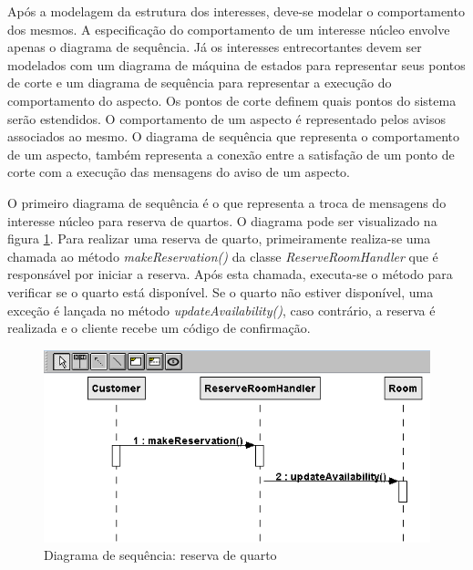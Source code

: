 Após a modelagem da estrutura dos interesses, deve-se modelar o comportamento dos mesmos. A especificação do comportamento de um interesse núcleo
envolve apenas o diagrama de sequência. Já os interesses entrecortantes devem ser modelados com um diagrama de máquina de estados para representar
seus pontos de corte e um diagrama de sequência para representar a execução do comportamento do aspecto. Os pontos de corte definem quais pontos do
sistema serão estendidos. O comportamento de um aspecto é representado pelos avisos associados ao mesmo. O diagrama de sequência que representa o
comportamento de um aspecto, também representa a conexão entre a satisfação de um ponto de corte com a execução das mensagens do aviso de um aspecto.

O primeiro diagrama de sequência é o que representa a troca de mensagens do interesse núcleo para reserva de quartos. O diagrama pode ser visualizado
na figura \ref{fig:case_study_behavioral_reserve_room}. Para realizar uma reserva de quarto, primeiramente realiza-se uma chamada ao método
\textit{makeReservation()} da classe \textit{ReserveRoomHandler} que é responsável por iniciar a reserva. Após esta chamada, executa-se o método
para verificar se o quarto está disponível. Se o quarto não estiver disponível, uma exceção é lançada no método \textit{updateAvailability()}, caso
contrário, a reserva é realizada e o cliente recebe um código de confirmação.

  \begin{figure}[!b]
	\centering
	\includegraphics{img/case_study_behavioral_reserve_room.png}
	\caption{Diagrama de sequência: reserva de quarto}\label{fig:case_study_behavioral_reserve_room}
  \end{figure}
  

